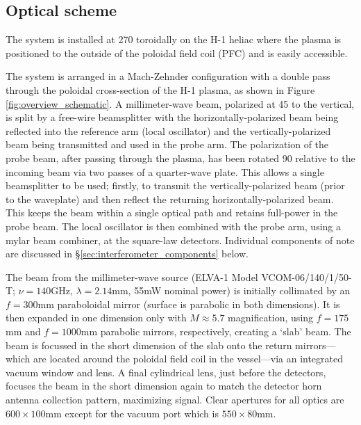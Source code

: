 \thispagestyle{empty}
\subsection{Optical scheme}
The system is installed at 270\degrees{} toroidally on the H-1 heliac
where the plasma is positioned to the outside of the poloidal field
coil (PFC) and is easily accessible.

The system is arranged in a Mach-Zehnder configuration with a double
pass through the poloidal cross-section of the H-1 plasma, as shown in
Figure \ref{fig:overview_schematic}.
A millimeter-wave beam, polarized at 45\degrees{} to the vertical, is split by a
free-wire beamsplitter with the horizontally-polarized beam being
reflected into the reference arm (local oscillator) and the
vertically-polarized beam being transmitted and used in the probe arm.
The polarization of the probe beam, after passing through the plasma,
has been rotated 90\degrees{} relative to the incoming beam via two
passes of a quarter-wave plate.
This allows a single beamsplitter to be used; firstly, to transmit the
vertically-polarized beam (prior to the waveplate) and then reflect
the returning horizontally-polarized beam.
This keeps the beam within a single optical path and retains full-power in the probe beam.
The local oscillator is then combined with the probe arm, using a mylar
beam combiner, at the square-law detectors.
Individual components of note are discussed in
\S\ref{sec:interferometer_components} below.

The beam from the millimeter-wave source (ELVA-1 Model
VCOM-06/140/1/50-T; $\nu = 140$\ts{}GHz, $\lambda = 2.14$\ts{}mm,
55\ts{}mW nominal power) is initially collimated by an $f=300$\ts{}mm
paraboloidal mirror (surface is parabolic in both dimensions).
It is then expanded in one dimension only with $M\approx 5.7$
magnification, using $f=175$\ts{}mm and $f=1000$\ts{}mm parabolic
mirrors, respectively, creating a `slab' beam.
The beam is focussed in the short dimension of the slab onto the return
mirrors---which are located around the poloidal field coil in the
vessel---via an integrated vacuum window and lens.
A final cylindrical lens, just before the detectors, focuses the beam in
the short dimension again to match the detector horn antenna
collection pattern, maximizing signal.
Clear apertures for all optics are $600 \times 100$\ts{}mm except for
the vacuum port which is $550 \times 80$\ts{}mm. 

